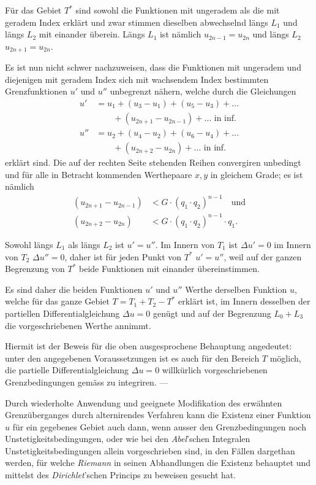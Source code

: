 \documentclass{article}
\begin{document}
Für das Gebiet $T^*$ sind sowohl die Funktionen mit ungeradem als die mit geradem Index erklärt und zwar stimmen dieselben abwechselnd längs $L_1$ und längs $L_2$ mit einander überein. Längs $L_1$ ist nämlich $u_{2n-1} = u_{2n}$ und längs $L_2$ $u_{2n+1} = u_{2n}$.

Es ist nun nicht schwer nachzuweisen, dass die Funktionen mit ungeradem und diejenigen mit geradem Index sich mit wachsendem Index bestimmten Grenzfunktionen $u'$ und $u''$ unbegrenzt nähern, welche durch die Gleichungen
\[
\begin{aligned}
u' &= u_1 + (u_3 - u_1) + (u_5 - u_3) + \dots \\
   &\qquad + (u_{2n+1} - u_{2n-1}) + \dots \text{ in inf.} \\
u'' &= u_2 + (u_4 - u_2) + (u_6 - u_4) + \dots \\
   &\qquad + (u_{2n+2} - u_{2n}) + \dots \text{ in inf.}
\end{aligned}
\]
erklärt sind. Die auf der rechten Seite stehenden Reihen convergiren unbedingt und für alle in Betracht kommenden Werthepaare $x, y$ in gleichem Grade; es ist nämlich
\[
\begin{aligned}
(u_{2n+1} - u_{2n-1}) & < G \cdot (q_1 \cdot q_2)^{n-1} \quad\text{und}\\
(u_{2n+2} - u_{2n}) & < G \cdot (q_1 \cdot q_2)^{n-1} \cdot q_1.
\end{aligned}
\]

Sowohl längs $L_1$ als längs $L_2$ ist $u' = u''$. Im Innern von $T_1$ ist $\Delta u' = 0$ im Innern von $T_2$ $\Delta u'' = 0$, daher ist für jeden Punkt von $T^*$ $u' = u''$, weil auf der ganzen Begrenzung von $T^*$ beide Funktionen mit einander übereinstimmen.

Es sind daher die beiden Funktionen $u'$ und $u''$ Werthe derselben Funktion $u$, welche für das ganze Gebiet $T = T_1 + T_2 - T^*$ erklärt ist, im Innern desselben der partiellen Differentialgleichung $\Delta u = 0$
genügt und auf der Begrenzung $L_0 + L_3$ die vorgeschriebenen Werthe annimmt.

Hiermit ist der Beweis für die oben ausgesprochene Behauptung angedeutet: unter den angegebenen Voraussetzungen ist es auch für den Bereich $T$ möglich, die partielle Differentialgleichung $\Delta u = 0$ willkürlich vorgeschriebenen Grenzbedingungen gemäss zu integriren. ---

Durch wiederholte Anwendung und geeignete Modifikation des erwähnten Grenzüberganges durch alternirendes Verfahren kann die Existenz einer Funktion $u$ für ein gegebenes Gebiet auch dann, wenn ausser den Grenzbedingungen noch Unstetigkeitsbedingungen, oder wie bei den \emph{Abel}'schen Integralen Unstetigkeitsbedingungen allein vorgeschrieben sind, in den Fällen dargethan werden, für welche \emph{Riemann} in seinen Abhandlungen die Existenz behauptet und mittelst des \emph{Dirichlet}'schen Princips zu beweisen gesucht hat.
\end{document}
